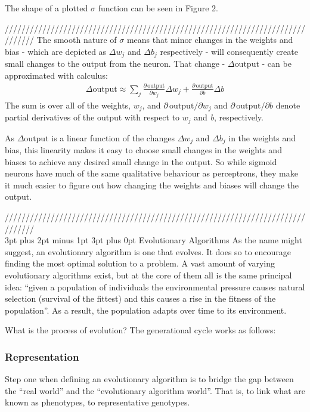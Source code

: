 \documentclass[12pt,a4paper]{article}
\makeatletter
\renewcommand\subsection{\@startsection {subsection}{1}{2mm} %
                               {3pt plus 2pt minus 1pt} %
                               {3pt plus 0pt} %
                               {\normalfont\bfseries}}
\makeatother
\begin{document}
The shape of a plotted $\sigma$ function can be seen in Figure 2. 

///////////////////////////////////////////////////////////////////////////////
The smooth nature of $\sigma$ means that minor changes in the weights and bias - which are depicted as $\Delta w_j$ and $\Delta b_j$ respectively - will consequently create small changes to the output from the neuron. That change - $\Delta \mbox{output}$ - can be approximated with calculus:
\begin{eqnarray} 
\Delta \mbox{output} \approx \sum_j \frac{\partial \, \mbox{output}}{\partial w_j}
\Delta w_j + \frac{\partial \, \mbox{output}}{\partial b} \Delta b
\end{eqnarray}
The sum is over all of the weights, $w_j$, and $\partial \, \mbox{output} / \partial w_j$
and $\partial \, \mbox{output} /\partial b$ denote partial derivatives of the output with respect to $w_j$ and  \textit{b}, respectively.

As $\Delta \mbox{output}$ is a linear function of the changes
$\Delta w_j$ and $\Delta b_j$ in the weights and bias, this linearity makes it easy to choose small changes in the weights and biases to achieve any desired small change in the output. So while sigmoid neurons have much of the same qualitative behaviour as perceptrons, they make it much easier to figure out how changing the weights and biases will change the output.

///////////////////////////////////////////////////////////////////////////////\\
\subsection{Evolutionary Algorithms}
As the name might suggest, an evolutionary algorithm is one that evolves. It does so to encourage finding the most optimal solution to a problem. A vast amount of varying evolutionary algorithms exist, but at the core of them all is the same principal idea: \enquote{given a population of individuals the environmental pressure causes natural selection (survival of the fittest) and this causes a rise in the fitness of the population}\citep{IntroductionToEvolutionaryComputing}. As a result, the population adapts over time to its environment. 

What is the process of evolution? The generational cycle works as follows:

\subsubsection{Representation}
Step one when defining an evolutionary algorithm is to bridge the gap between the \enquote{real world} and the \enquote{evolutionary algorithm world}\citep{IntroductionToEvolutionaryComputing}. That is, to link what are known as phenotypes, to representative genotypes. 
\end{document}
